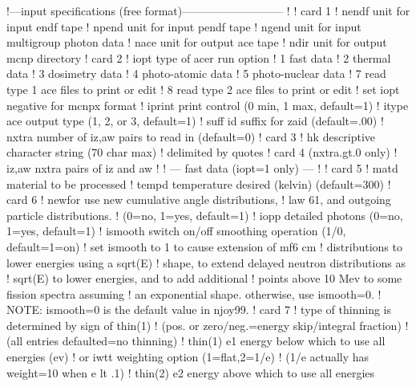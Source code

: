 \small
\begin{ccode}

   !---input specifications (free format)---------------------------
   !
   ! card 1
   !    nendf    unit for input endf tape
   !    npend    unit for input pendf tape
   !    ngend    unit for input multigroup photon data
   !    nace     unit for output ace tape
   !    ndir     unit for output mcnp directory
   ! card 2
   !    iopt     type of acer run option
   !               1   fast data
   !               2   thermal data
   !               3   dosimetry data
   !               4   photo-atomic data
   !               5   photo-nuclear data
   !               7   read type 1 ace files to print or edit
   !               8   read type 2 ace files to print or edit
   !                set iopt negative for mcnpx format
   !    iprint   print control (0 min, 1 max, default=1)
   !    itype    ace output type (1, 2, or 3, default=1)
   !    suff     id suffix for zaid (default=.00)
   !    nxtra    number of iz,aw pairs to read in (default=0)
   ! card 3
   !    hk       descriptive character string (70 char max)
   !             delimited by quotes
   ! card 4 (nxtra.gt.0 only)
   !    iz,aw    nxtra pairs of iz and aw
   !
   !    --- fast data (iopt=1 only) ---
   !
   ! card 5
   !    matd     material to be processed
   !    tempd    temperature desired (kelvin) (default=300)
   ! card 6
   !    newfor   use new cumulative angle distributions,
   !               law 61, and outgoing particle distributions.
   !               (0=no, 1=yes, default=1)
   !    iopp     detailed photons (0=no, 1=yes, default=1)
   !    ismooth  switch on/off smoothing operation (1/0, default=1=on)
   !               set ismooth to 1 to cause extension of mf6 cm
   !               distributions to lower energies using a sqrt(E)
   !               shape, to extend delayed neutron distributions as
   !               sqrt(E) to lower energies, and to add additional
   !               points above 10 Mev to some fission spectra assuming
   !               an exponential shape.  otherwise, use ismooth=0.
   !               NOTE:  ismooth=0 is the default value in njoy99.
   ! card 7
   !  type of thinning is determined by sign of thin(1)
   !  (pos. or zero/neg.=energy skip/integral fraction)
   !  (all entries defaulted=no thinning)
   !    thin(1)  e1 energy below which to use all energies (ev)
   !             or iwtt weighting option (1=flat,2=1/e)
   !             (1/e actually has weight=10 when e lt .1)
   !    thin(2)  e2 energy above which to use all energies

\end{ccode}
